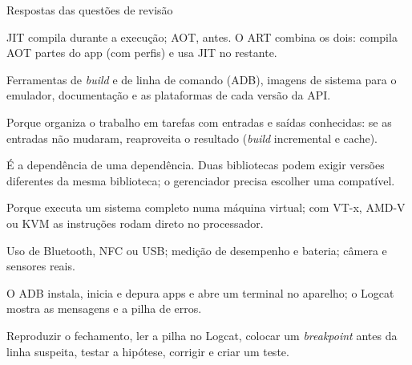 \documentclass[aspectratio=169,10pt]{beamer}
\begin{document}
\begin{frame}{Respostas das questões de revisão}
  \begin{respostas}
    \item JIT compila durante a execução; AOT, antes. O ART combina os dois: compila AOT partes do app (com perfis) e usa JIT no restante.
    \item Ferramentas de \emph{build} e de linha de comando (ADB), imagens de sistema para o emulador, documentação e as plataformas de cada versão da API.
    \item Porque organiza o trabalho em tarefas com entradas e saídas conhecidas: se as entradas não mudaram, reaproveita o resultado (\emph{build} incremental e cache).
    \item É a dependência de uma dependência. Duas bibliotecas podem exigir versões diferentes da mesma biblioteca; o gerenciador precisa escolher uma compatível.
    \item Porque executa um sistema completo numa máquina virtual; com VT-x, AMD-V ou KVM as instruções rodam direto no processador.
    \item Uso de Bluetooth, NFC ou USB; medição de desempenho e bateria; câmera e sensores reais.
    \item O ADB instala, inicia e depura apps e abre um terminal no aparelho; o Logcat mostra as mensagens e a pilha de erros.
    \item Reproduzir o fechamento, ler a pilha no Logcat, colocar um \emph{breakpoint} antes da linha suspeita, testar a hipótese, corrigir e criar um teste.
  \end{respostas}
\end{frame}

\end{document}
